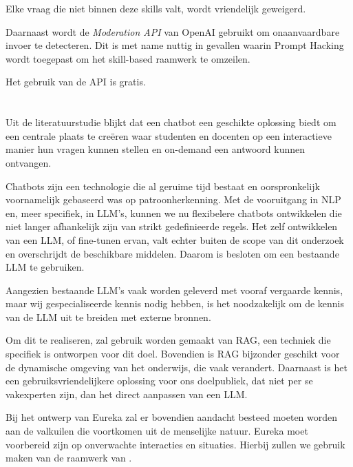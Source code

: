 Elke vraag die niet binnen deze skills valt, wordt vriendelijk geweigerd.

Daarnaast wordt de \emph{Moderation API} van OpenAI gebruikt om onaanvaardbare invoer te detecteren. Dit is met name nuttig in gevallen waarin Prompt Hacking wordt toegepast om het skill-based raamwerk te omzeilen.

Het gebruik van de API is gratis.

\section{}%
\label{sec:besluit}

Uit de literatuurstudie blijkt dat een chatbot een geschikte oplossing biedt om een centrale plaats te creëren waar studenten en docenten op een interactieve manier hun vragen kunnen stellen en on-demand een antwoord kunnen ontvangen.

Chatbots zijn een technologie die al geruime tijd bestaat en oorspronkelijk voornamelijk gebaseerd was op patroonherkenning. Met de vooruitgang in \acrshort{NLP} en, meer specifiek, in \acrshort{LLM}'s, kunnen we nu flexibelere chatbots ontwikkelen die niet langer afhankelijk zijn van strikt gedefinieerde regels. Het zelf ontwikkelen van een \acrshort{LLM}, of fine-tunen ervan, valt echter buiten de scope van dit onderzoek en overschrijdt de beschikbare middelen. Daarom is besloten om een bestaande \acrshort{LLM} te gebruiken.

Aangezien bestaande \acrshort{LLM}'s vaak worden geleverd met vooraf vergaarde kennis, maar wij gespecialiseerde kennis nodig hebben, is het noodzakelijk om de kennis van de \acrshort{LLM} uit te breiden met externe bronnen.

Om dit te realiseren, zal gebruik worden gemaakt van RAG, een techniek die specifiek is ontworpen voor dit doel. Bovendien is RAG bijzonder geschikt voor de dynamische omgeving van het onderwijs, die vaak verandert. Daarnaast is het een gebruiksvriendelijkere oplossing voor ons doelpubliek, dat niet per se vakexperten zijn, dan het direct aanpassen van een \acrshort{LLM}.

Bij het ontwerp van Eureka zal er bovendien aandacht besteed moeten worden aan de valkuilen die voortkomen uit de menselijke natuur. Eureka moet voorbereid zijn op onverwachte interacties en situaties. Hierbij zullen we gebruik maken van de raamwerk van \textcite{Taneja2024}.


